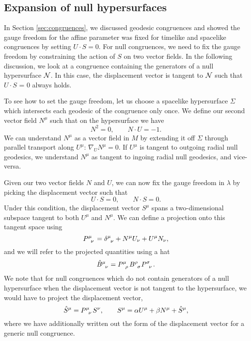 \subsection{Expansion of null hypersurfaces}
\label{sec:expansionnullhyper}
In Section \ref{sec:congruences}, we discussed geodesic congruences and showed the gauge freedom for the affine parameter was fixed for timelike and spacelike congruences by setting $U \cdot S = 0$. For null congruences, we need to fix the gauge freedom by constraining the action of $S$ on two vector fields. In the following discussion, we look at a congruence containing the generators of a null hypersurface ${\cal N}$. In this case, the displacement vector is tangent to ${\cal N}$ such that $U \cdot S$ = 0 always holds.

To see how to set the gauge freedom, let us choose a spacelike hypersurface $\Sigma$ which intersects each geodesic of the congruence only once. We define our second vector field $N^\mu$ such that on the hypersurface we have
\begin{equation*}
	N^2 = 0, \qquad N \cdot U = -1.
\end{equation*}
We can understand $N^\mu$ as a vector field in $M$ by extending it off $\Sigma$ through parallel transport along $U^\mu$: $\nabla_U N^\mu = 0$. If $U^\mu$ is tangent to outgoing radial null geodesics, we understand $N^\mu$ as tangent to ingoing radial null geodesics, and vice-versa.

Given our two vector fields $N$ and $U$, we can now fix the gauge freedom in $\lambda$ by picking the displacement vector such that
\begin{equation*}
	U \cdot S = 0, \qquad N \cdot S = 0.
\end{equation*}
Under this condition, the displacement vector $S^\mu$ spans a two-dimensional subspace tangent to both $U^\mu$ and $N^\mu$. We can define a projection onto this tangent space using
\begin{equation*}
\tensor{P}{^\mu_\nu} = \tensor{\delta}{^\mu_\nu} + N^\mu U_\nu + U^\mu N_\nu,
\end{equation*}
and we will refer to the projected quantities using a hat
\begin{equation*}
	\tensor{\hat{B}}{^\mu_\nu} = \tensor{P}{^\mu_\rho} \tensor{B}{^\rho_\sigma} \tensor{P}{^\sigma_\nu}.
\end{equation*}
We note that for null congruences which do not contain generators of a null hypersurface \ie when the displacement vector is not tangent to the hypersurface, we would have to project the displacement vector, 
\begin{equation*}
	\hat{S}^\mu = \tensor{P}{^\mu_\nu} S^\nu, \qquad S^\mu = \alpha U^\mu + \beta N^\mu + \hat{S}^\mu,
\end{equation*}
where we have additionally written out the form of the displacement vector for a generic null congruence.


